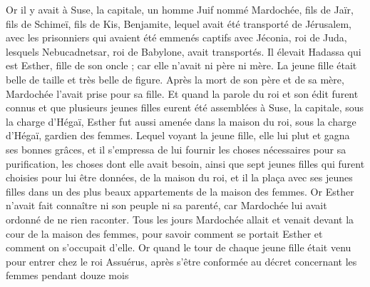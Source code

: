 \begin{multicols}{2}
Or il y avait à Suse, la capitale, un homme Juif nommé Mardochée, fils de Jaïr, fils de Schimeï, fils de Kis, Benjamite,
lequel avait été transporté de Jérusalem, avec les prisonniers qui avaient été emmenés captifs avec Jéconia, roi de Juda, lesquels Nebucadnetsar, roi de Babylone, avait transportés.
Il élevait Hadassa qui est Esther, fille de son oncle ; car elle n'avait ni père ni mère. La jeune fille était belle de taille et très belle de figure. Après la mort de son père et de sa mère, Mardochée l'avait prise pour sa fille.
Et quand la parole du roi et son édit furent connus et que plusieurs jeunes filles eurent été assemblées à Suse, la capitale, sous la charge d'Hégaï, Esther fut aussi amenée dans la maison du roi, sous la charge d'Hégaï, gardien des femmes.
Lequel voyant la jeune fille, elle lui plut et gagna ses bonnes grâces, et il s'empressa de lui fournir les choses nécessaires pour sa purification, les choses dont elle avait besoin, ainsi que sept jeunes filles qui furent choisies pour lui être données, de la maison du roi, et il la plaça avec ses jeunes filles dans un des plus beaux appartements de la maison des femmes.
Or Esther n'avait fait connaître ni son peuple ni sa parenté, car Mardochée lui avait ordonné de ne rien raconter.
Tous les jours Mardochée allait et venait devant la cour de la maison des femmes, pour savoir comment se portait Esther et comment on s'occupait d'elle.
Or quand le tour de chaque jeune fille était venu pour entrer chez le roi Assuérus, après s'être conformée au décret concernant les femmes pendant douze mois
\end{multicols}
